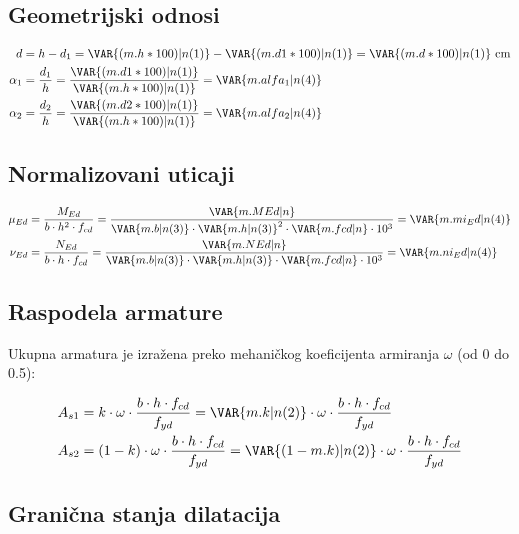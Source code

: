 \subsection{Geometrijski odnosi}

\begin{align*}
d &= h - d_1 = \VAR{(m.h*100)|n(1)} - \VAR{(m.d1*100)|n(1)} = \VAR{(m.d*100)|n(1)} \ \mathrm{cm} \\
\alpha_1 &= \frac{d_1}{h} = \frac{\VAR{(m.d1*100)|n(1)}}{\VAR{(m.h*100)|n(1)}} = \VAR{m.alfa_1|n(4)} \\
\alpha_2 &= \frac{d_2}{h} = \frac{\VAR{(m.d2*100)|n(1)}}{\VAR{(m.h*100)|n(1)}} = \VAR{m.alfa_2|n(4)}
\end{align*}

\subsection{Normalizovani uticaji}

\begin{align*}
\mu_{Ed} &= \frac{M_{Ed}}{b \cdot h^2 \cdot f_{cd}} = \frac{\VAR{m.MEd|n}}{\VAR{m.b|n(3)} \cdot \VAR{m.h|n(3)}^2 \cdot \VAR{m.fcd|n} \cdot 10^3} = \VAR{m.mi_Ed|n(4)} \\
\nu_{Ed} &= \frac{N_{Ed}}{b \cdot h \cdot f_{cd}} = \frac{\VAR{m.NEd|n}}{\VAR{m.b|n(3)} \cdot \VAR{m.h|n(3)} \cdot \VAR{m.fcd|n} \cdot 10^3} = \VAR{m.ni_Ed|n(4)}
\end{align*}

\subsection{Raspodela armature}

Ukupna armatura je izražena preko mehaničkog koeficijenta armiranja $\omega$ (od 0 do 0.5):

\begin{align*}
A_{s1} &= k \cdot \omega \cdot \frac{b \cdot h \cdot f_{cd}}{f_{yd}} = \VAR{m.k|n(2)} \cdot \omega \cdot \frac{b \cdot h \cdot f_{cd}}{f_{yd}} \\
A_{s2} &= (1 - k) \cdot \omega \cdot \frac{b \cdot h \cdot f_{cd}}{f_{yd}} = \VAR{(1 - m.k)|n(2)} \cdot \omega \cdot \frac{b \cdot h \cdot f_{cd}}{f_{yd}}
\end{align*}

\subsection{Granična stanja dilatacija}

